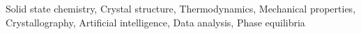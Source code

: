 \documentclass[]{article}
\begin{document}
Solid state chemistry, Crystal structure, Thermodynamics, Mechanical properties, Crystallography, Artificial intelligence, Data analysis, Phase equilibria
\end{document}
